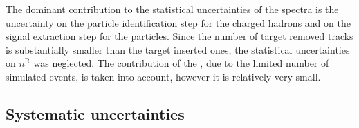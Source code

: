 The dominant contribution to the statistical uncertainties
of the spectra is the uncertainty on the particle identification
step for the charged hadrons and on the signal extraction step
for the \vzero particles.
Since the number of target removed tracks is substantially
smaller than the target inserted ones,  
the statistical uncertainties on $n^\text{R}$ was neglected.
The contribution of the \cmc, due to the limited number of
simulated events, is taken into account, however it
is relatively very small. 


\subsection{Systematic uncertainties}
\label{sec:hadron:spec:syst}


